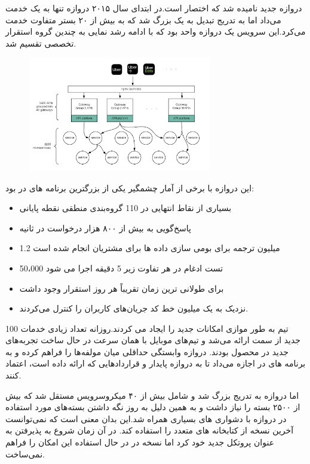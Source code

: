 دروازه جدید  نامیده شد که اختصار  است.در ابتدای سال ۲۰۱۵ دروازه تنها به یک  خدمت می‌داد اما به تدریج تبدیل به یک  بزرگ شد که به بیش از ۲۰ بستر متفاوت خدمت می‌کرد.این سرویس یک دروازه واحد بود که با ادامه رشد نمایی به چندین گروه استقرار تخصصی تقسیم شد.
\begin{figure}[h]
\label{fig:apigateway_gen2}
\centering
\includegraphics[width=8cm]{gen2_apigateway.png}
\end{figure}

این دروازه با برخی از آمار چشمگیر یکی از بزرگترین برنامه های  در  بود:
\begin{itemize}
\item
بسیاری از نقاط انتهایی در 110 گروه‌بندی منطقی نقطه پایانی
\item
پاسخ‌گویی به بیش از ۸۰۰ هزار درخواست در ثانیه
\item
1.2 میلیون ترجمه برای بومی سازی داده ها برای مشتریان انجام شده است
\item
50،000 تست ادغام در هر تفاوت زیر 5 دقیقه اجرا می شود
\item
برای طولانی ترین زمان تقریباً هر روز استقرار وجود داشت
\item
نزدیک به یک میلیون خط کد جریان‌های کاربران را کنترل می‌کردند.
\end{itemize}

100 تیم به طور موازی امکانات جدید را ایجاد می کردند.روزانه تعداد زیادی خدمات جدید از سمت  ارائه می‌شد و تیم‌های موبایل با همان سرعت در حال ساخت تجربه‌های جدید در محصول بودند. دروازه وابستگی حداقلی میان مولفه‌ها را فراهم کرده و به برنامه های در  اجازه می‌داد تا به دروازه  پایدار و قراردادهایی که ارائه داده است، اعتماد کنند.

اما دروازه به تدریج بزرگ شد و شامل بیش از ۴۰ میکروسرویس مستقل شد که بیش از ۲۵۰۰ بسته  را نیاز داشت و به همین دلیل به روز نگه داشتن بسته‌های مورد استفاده در دروازه با دشواری های بسیاری همراه شد.این بدان معنی است که  نمی‌توانست آخرین نسخه از کتابخانه های متعدد را استفاده کند. در آن زمان  شروع به پذیرفتن  به عنوان پروتکل جدید خود کرد اما نسخه    در در حال استفاده این امکان را فراهم نمی‌ساخت.

